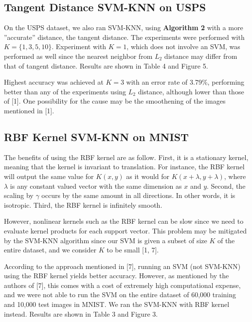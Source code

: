 \documentclass[11pt,letterpaper]{article}
\begin{document}
\subsection{Tangent Distance SVM-KNN on USPS}

On the USPS dataset, we also ran SVM-KNN, using \textbf{Algorithm 2} with a more ''accurate'' distance, the tangent distance. The experiments were performed with $K = \{1, 3, 5, 10\}$. Experiment with $K = 1$, which does not involve an SVM, was performed as well since the nearest neighbor from $L_2$ distance may differ from that of tangent distance. Results are shown in Table 4 and Figure 5.

Highest accuracy was achieved at $K=3$ with an error rate of 3.79\%, performing better than any of the experiments using $L_2$ distance, although lower than those of [1]. One possibility for the cause may be the smoothening of the images mentioned in [1].


\subsection{RBF Kernel SVM-KNN on MNIST}

The benefits of using the RBF kernel are as follow. First, it is a stationary kernel, meaning that the kernel is invariant to translation. For instance, the RBF kernel will output the same value for $K(x,y)$ as it would for $K(x+\lambda, y+\lambda)$, where $\lambda$ is any constant valued vector with the same dimension as $x$ and $y$. Second, the scaling by $\gamma$ occurs by the same amount in all directions. In other words, it is isotropic. Third, the RBF kernel is infinitely smooth.

However, nonlinear kernels such as the RBF kernel can be slow since we need to evaluate kernel products for each support vector. This problem may be mitigated by the SVM-KNN algorithm since our SVM is given a subset of size $K$ of the entire dataset, and we consider $K$ to be small [1, 7].

According to the approach mentioned in [7], running an SVM (not SVM-KNN) using the RBF kernel yields better accuracy. However, as mentioned by the authors of [7], this comes with a cost of extremely high computational expense, and we were not able to run the SVM on the entire dataset of 60,000 training and 10,000 test images in MNIST. We ran the SVM-KNN with RBF kernel instead. Results are shown in Table 3 and Figure 3.
\end{document}
